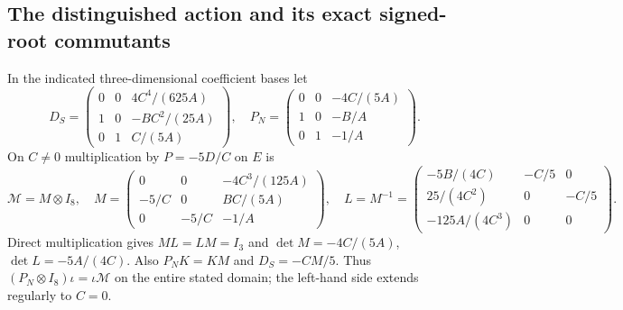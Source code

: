 \documentclass[11pt]{article}
\begin{document}
\subsection{The distinguished action and its exact signed-root commutants}
In the indicated three-dimensional coefficient bases let
\[
 D_S=\begin{pmatrix}0&0&4C^4/(625A)\\1&0&-BC^2/(25A)\\0&1&C/(5A)\end{pmatrix},
 \quad
 P_N=\begin{pmatrix}0&0&-4C/(5A)\\1&0&-B/A\\0&1&-1/A\end{pmatrix}.
                                                               \tag{ETR8}
\]
On $C\ne0$ multiplication by $P=-5D/C$ on $E$ is
\[
 \mathcal M=M\otimes I_8,\quad
 M=\begin{pmatrix}0&0&-4C^3/(125A)\\-5/C&0&BC/(5A)\\0&-5/C&-1/A\end{pmatrix},
 \quad
 L=M^{-1}=\begin{pmatrix}-5B/(4C)&-C/5&0\\25/(4C^2)&0&-C/5\\-125A/(4C^3)&0&0\end{pmatrix}.
                                                               \tag{ETR9}
\]
Direct multiplication gives $ML=LM=I_3$ and
$\det M=-4C/(5A)$, $\det L=-5A/(4C)$. Also
$P_NK=KM$ and $D_S=-CM/5$. Thus $(P_N\otimes I_8)\iota
=\iota\mathcal M$ on the entire stated domain; the left-hand side
extends regularly to $C=0$.
\end{document}
